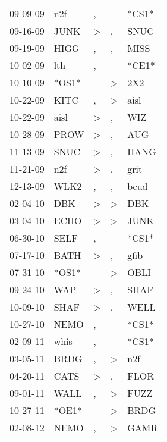 \begin{supertabular}{lllll}
 09-09-09 &    n2f &                , &               &  *CS1* \\
 09-16-09 &   JUNK &     \textgreater &             , &   SNUC \\
 09-19-09 &   HIGG &                , &             , &   MISS \\
 10-02-09 &    lth &                , &               &  *CE1* \\
 10-10-09 &  *OS1* &                  &  \textgreater &    2X2 \\
 10-22-09 &   KITC &                , &  \textgreater &   aisl \\
 10-22-09 &   aisl &     \textgreater &             , &    WIZ \\
 10-28-09 &   PROW &     \textgreater &             , &    AUG \\
 11-13-09 &   SNUC &     \textgreater &             , &   HANG \\
 11-21-09 &    n2f &     \textgreater &             , &   grit \\
 12-13-09 &   WLK2 &                , &             , &   bcud \\
 02-04-10 &    DBK &     \textgreater &  \textgreater &    DBK \\
 03-04-10 &   ECHO &     \textgreater &  \textgreater &   JUNK \\
 06-30-10 &   SELF &                , &               &  *CS1* \\
 07-17-10 &   BATH &     \textgreater &             , &   gfib \\
 07-31-10 &  *OS1* &                  &  \textgreater &   OBLI \\
 09-24-10 &    WAP &     \textgreater &             , &   SHAF \\
 10-09-10 &   SHAF &     \textgreater &             , &   WELL \\
 10-27-10 &   NEMO &                , &               &  *CS1* \\
 02-09-11 &   whis &                , &               &  *CS1* \\
 03-05-11 &   BRDG &                , &  \textgreater &    n2f \\
 04-20-11 &   CATS &     \textgreater &             , &   FLOR \\
 09-01-11 &   WALL &                , &  \textgreater &   FUZZ \\
 10-27-11 &  *OE1* &                  &  \textgreater &   BRDG \\
 02-08-12 &   NEMO &                , &  \textgreater &   GAMR \\

\end{supertabular}
